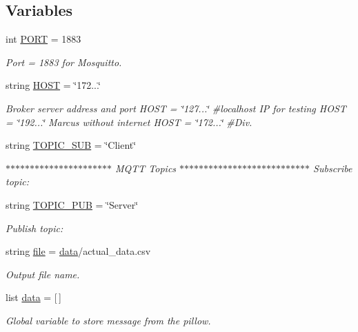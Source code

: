 \subsection*{Variables}
\begin{DoxyCompactItemize}
\item 
int \mbox{\hyperlink{namespace_server_a85bc202868de60677316802bf3d93153}{P\+O\+RT}} = 1883
\begin{DoxyCompactList}\small\item\em Port = 1883 for Mosquitto. \end{DoxyCompactList}\item 
string \mbox{\hyperlink{namespace_server_a9fa81685c7f5d34d1133b0e9547aa87c}{H\+O\+ST}} = \char`\"{}172...\char`\"{}
\begin{DoxyCompactList}\small\item\em Broker server address and port H\+O\+ST = \char`\"{}127...\char`\"{} \#localhost IP for testing H\+O\+ST = \char`\"{}192...\char`\"{} Marcus without internet H\+O\+ST = \char`\"{}172...\char`\"{} \#\+Div. \end{DoxyCompactList}\item 
string \mbox{\hyperlink{namespace_server_afcd608cd44f88ac1ebee051338c898bf}{T\+O\+P\+I\+C\+\_\+\+S\+UB}} = \char`\"{}Client\char`\"{}
\begin{DoxyCompactList}\small\item\em \textquotesingle{}\textquotesingle{}\textquotesingle{} $\ast$$\ast$$\ast$$\ast$$\ast$$\ast$$\ast$$\ast$$\ast$$\ast$$\ast$$\ast$$\ast$$\ast$$\ast$$\ast$$\ast$$\ast$$\ast$$\ast$$\ast$$\ast$ M\+Q\+TT Topics $\ast$$\ast$$\ast$$\ast$$\ast$$\ast$$\ast$$\ast$$\ast$$\ast$$\ast$$\ast$$\ast$$\ast$$\ast$$\ast$$\ast$$\ast$$\ast$$\ast$$\ast$$\ast$$\ast$$\ast$$\ast$$\ast$$\ast$ \textquotesingle{}\textquotesingle{}\textquotesingle{} Subscribe topic\+: \end{DoxyCompactList}\item 
string \mbox{\hyperlink{namespace_server_a13a60a238235099f7fa3dfce80b8fb8e}{T\+O\+P\+I\+C\+\_\+\+P\+UB}} = \char`\"{}Server\char`\"{}
\begin{DoxyCompactList}\small\item\em Publish topic\+: \end{DoxyCompactList}\item 
string \mbox{\hyperlink{namespace_server_ac397818c85a9e0a597e387eb960fd899}{file}} = \textquotesingle{}\mbox{\hyperlink{namespace_server_af5424372056e32036c88680bbd6d95aa}{data}}/actual\+\_\+data.\+csv\textquotesingle{}
\begin{DoxyCompactList}\small\item\em Output file name. \end{DoxyCompactList}\item 
list \mbox{\hyperlink{namespace_server_af5424372056e32036c88680bbd6d95aa}{data}} = \mbox{[}$\,$\mbox{]}
\begin{DoxyCompactList}\small\item\em Global variable to store message from the pillow. \end{DoxyCompactList}\end{DoxyCompactItemize}


